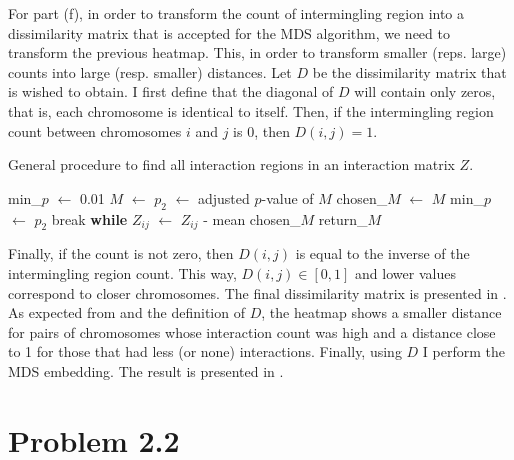 \documentclass[11pt, english, twocolumn]{article}
\begin{document}
For part (f), in order to transform the count of intermingling region into a dissimilarity matrix that is accepted for the MDS algorithm, we need to transform the previous heatmap. This, in order to transform smaller (reps. large) counts into large (resp. smaller) distances. Let $D$ be the dissimilarity matrix that is wished to obtain. I first define that the diagonal of $D$ will contain only zeros, that is, each chromosome is identical to itself. Then, if the intermingling region count between chromosomes $i$ and $j$ is 0, then $D(i,j) = 1$. 

\begin{algorithm}[H]
	\caption{General procedure to find all interaction regions in an interaction matrix $Z$.}
	\label{alg:overall-greedy-search}\vspace{1ex}
	\begin{algorithmic}
		\State min\_$p$ $\gets$ 0.01
				\State $M$ $\gets$ 
				\State $p_{2}$ $\gets$ adjusted $p$-value of $M$
					\State chosen\_$M$ $\gets$ $M$
					\State min\_$p$ $\gets$ $p_{2}$
				\EndIf
			\EndFor
				\State break {\bf while}
			\EndIf
			\State $Z_{ij}$ $\gets$ $Z_{ij}$ - mean chosen\_$M$ 
		\EndWhile
		\State\Return return\_$M$
	\EndFunction
	\end{algorithmic}
\end{algorithm}

Finally, if the count is not zero, then $D(i,j)$ is equal to the inverse of the intermingling region count. This way, $D(i,j) \in [0,1]$ and lower values correspond to closer chromosomes. The final dissimilarity matrix is presented in . As expected from  and the definition of $D$, the heatmap shows a smaller distance for pairs of chromosomes whose interaction count was high and a distance close to 1 for those that had less (or none) interactions. Finally, using $D$ I perform the MDS embedding. The result is presented in .



\section*{Problem 2.2}
\end{document}
